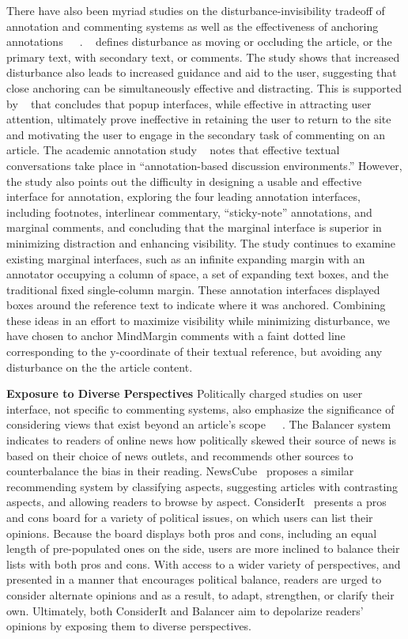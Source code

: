 There have also been myriad studies on the disturbance-invisibility tradeoff of annotation and commenting systems as well as the effectiveness of anchoring annotations~\cite{FluidDocs}~\cite{Wikipedia}~\cite{AnnotationsStudents}. ~\cite{FluidDocs} defines disturbance as moving or occluding the article, or the primary text, with secondary text, or comments. The study shows that increased disturbance also leads to increased guidance and aid to the user, suggesting that close anchoring can be simultaneously effective and distracting. This is supported by ~\cite{Wikipedia} that concludes that popup interfaces, while effective in attracting user attention, ultimately prove ineffective in retaining the user to return to the site and motivating the user to engage in the secondary task of commenting on an article.  The academic annotation study ~\cite{AnnotationsStudents} notes that effective textual conversations take place in ``annotation-based discussion environments.'' However, the study also points out the difficulty in designing a usable and effective interface for annotation, exploring the four leading annotation interfaces, including footnotes, interlinear commentary, ``sticky-note'' annotations, and marginal comments, and concluding that the marginal interface is superior in minimizing distraction and enhancing visibility. The study continues to examine existing marginal interfaces, such as an infinite expanding margin with an annotator occupying a column of space, a set of expanding text boxes, and the traditional fixed single-column margin. These annotation interfaces displayed boxes around the reference text to indicate where it was anchored. Combining these ideas in an effort to maximize visibility while minimizing disturbance, we have chosen to anchor MindMargin comments with a faint dotted line corresponding to the y-coordinate of their textual reference, but avoiding any disturbance on the the article content. 

\textbf{Exposure to Diverse Perspectives}
Politically charged studies on user interface, not specific to commenting systems, also emphasize the significance of considering views that exist beyond an article's scope~\cite{Politics}~\cite{NewsCube}~\cite{ConsiderIt}. The Balancer system~\cite{Politics} indicates to readers of online news how politically skewed their source of news is based on their choice of news outlets, and recommends other sources to counterbalance the bias in their reading. NewsCube~\cite{NewsCube} proposes a similar recommending system by classifying aspects, suggesting articles with contrasting aspects, and allowing readers to browse by aspect. ConsiderIt~\cite{ConsiderIt} presents a pros and cons board for a variety of political issues, on which users can list their opinions. Because the board displays both pros and cons, including an equal length of pre-populated ones on the side, users are more inclined to balance their lists with both pros and cons. With access to a wider variety of perspectives, and presented in a manner that encourages political balance, readers are urged to consider alternate opinions and as a result, to adapt, strengthen, or clarify their own. Ultimately, both ConsiderIt and Balancer aim to depolarize readers' opinions by exposing them to diverse perspectives.


